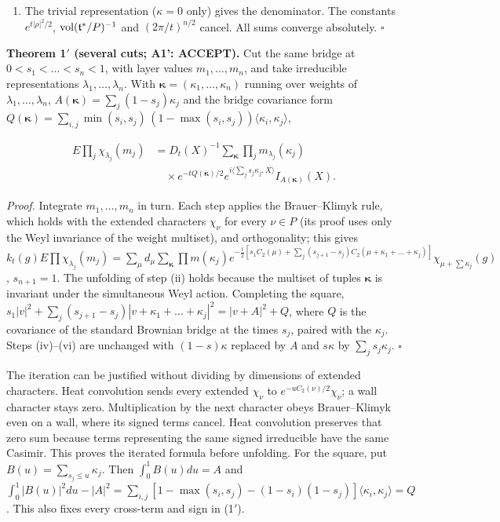 \documentclass[11pt,a4paper]{article}
\newcommand{\tightlist}{\setlength{\itemsep}{0pt}\setlength{\parskip}{0pt}}
\begin{document}
\begin{enumerate}
\def\labelenumi{(\roman{enumi})}
\setcounter{enumi}{5}
\tightlist
\item
  The trivial representation (\(\kappa=0\) only) gives the denominator.
  The constants \(e^{t|\rho|^2/2}\), \({\rm vol}(\mathfrak t^*/P)^{-1}\)
  and \((2\pi/t)^{n/2}\) cancel. All sums converge absolutely.
  \(\square\)
\end{enumerate}

\textbf{Theorem 1\('\) (several cuts; A1': ACCEPT).} Cut the same bridge
at \(0<s_1<\dots<s_n<1\), with layer values \(m_1,\dots,m_n\), and take
irreducible representations \(\lambda_1,\dots,\lambda_n\). With
\(\boldsymbol\kappa=(\kappa_1,\dots,\kappa_n)\) running over weights of
\(\lambda_1,\dots,\lambda_n\),
\(A(\boldsymbol\kappa)=\sum_j(1-s_j)\kappa_j\) and the bridge covariance
form
\(Q(\boldsymbol\kappa)=\sum_{i,j}\min(s_i,s_j)\,(1-\max(s_i,s_j))\langle\kappa_i,\kappa_j\rangle\),

\[\begin{aligned}
E\prod_j\chi_{\lambda_j}(m_j)
&=D_t(X)^{-1}\sum_{\boldsymbol\kappa}\prod_jm_{\lambda_j}(\kappa_j)\\
&\quad\times e^{-tQ(\boldsymbol\kappa)/2}
e^{i\langle\sum_js_j\kappa_j,X\rangle}I_{A(\boldsymbol\kappa)}(X).
\end{aligned}\tag{1$'$}\]

\emph{Proof.} Integrate \(m_1,\dots,m_n\) in turn. Each step applies the
Brauer--Klimyk rule, which holds with the extended characters
\(\chi_\nu\) for every \(\nu\in P\) (its proof uses only the Weyl
invariance of the weight multiset), and orthogonality; this gives
\(k_t(g)E\prod\chi_{\lambda_j}(m_j)=\sum_\mu d_\mu\sum_{\boldsymbol\kappa}\prod m(\kappa_j) e^{-\frac t2[s_1C_2(\mu)+\sum_j(s_{j+1}-s_j)C_2(\mu+\kappa_1+\dots+\kappa_j)]}\chi_{\mu+\sum\kappa_j}(g)\),
\(s_{n+1}=1\). The unfolding of step (ii) holds because the multiset of
tuples \(\boldsymbol\kappa\) is invariant under the simultaneous Weyl
action. Completing the square,
\(s_1|v|^2+\sum_j(s_{j+1}-s_j)|v+\kappa_1+\dots+\kappa_j|^2=|v+A|^2+Q\),
where \(Q\) is the covariance of the standard Brownian bridge at the
times \(s_j\), paired with the \(\kappa_j\). Steps (iv)--(vi) are
unchanged with \((1-s)\kappa\) replaced by \(A\) and \(s\kappa\) by
\(\sum_js_j\kappa_j\). \(\square\)

The iteration can be justified without dividing by dimensions of
extended characters. Heat convolution sends every extended \(\chi_\nu\)
to \(e^{-uC_2(\nu)/2}\chi_\nu\); a wall character stays zero.
Multiplication by the next character obeys Brauer--Klimyk even on a
wall, where its signed terms cancel. Heat convolution preserves that
zero sum because terms representing the same signed irreducible have the
same Casimir. This proves the iterated formula before unfolding. For the
square, put \(B(u)=\sum_{s_j\le u}\kappa_j\). Then \(\int_0^1B(u)du=A\)
and
\(\int_0^1|B(u)|^2du-|A|^2 =\sum_{i,j}[1-\max(s_i,s_j)-(1-s_i)(1-s_j)] \langle\kappa_i,\kappa_j\rangle=Q\).
This also fixes every cross-term and sign in (1\('\)).
\end{document}
